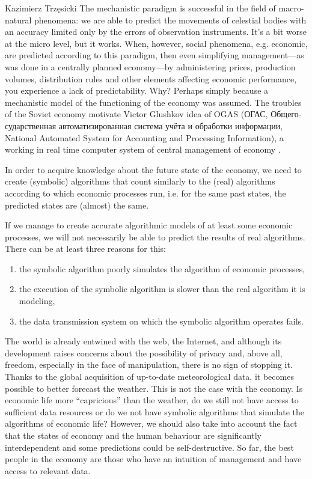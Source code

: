 \begin{artengenv}{Kazimierz Trzęsicki}
The mechanistic paradigm is successful in the field of macro-natural phenomena: we are able to predict the movements of celestial bodies with an accuracy limited only by the errors of observation instruments. It's a bit worse at the micro level, but it works. When, however, social phenomena, e.g. economic, are predicted according to this paradigm, then even simplifying management---as was done in a centrally planned economy---by administering prices, production volumes, distribution rules and other elements affecting economic performance, you experience a lack of predictability. Why? Perhaps simply because a mechanistic model of the functioning of the economy was assumed. The troubles of the Soviet economy motivate Victor Glushkov idea of  OGAS (\foreignlanguage{russian}{ОГАС}, \foreignlanguage{russian}{Общегосударственная автоматизированная система учёта и обработки информации}, National Automated System for Accounting and Processing Information), a working in real time computer system  of central management of  economy
\parencite{glushkov_chto_2004}.

In order to acquire knowledge about the future state of the economy, we need to create (symbolic) algorithms that count similarly to the (real) algorithms according to which economic processes run, i.e. for the same past states, the predicted states are (almost) the same.

If we manage to create accurate algorithmic models of at least some economic processes, we will not necessarily be able to predict the results of real algorithms. There can be at least three reasons for this: \begin{enumerate}
\item the symbolic algorithm poorly simulates the algorithm of economic processes,
\item the execution of the symbolic algorithm is slower than the real algorithm it is modeling,
\item the data transmission system on which the symbolic algorithm operates fails.
\end{enumerate}

The world is already entwined with the web, the Internet, and although its development raises concerns about the possibility of privacy and, above all, freedom, especially in the face of manipulation, there is no sign of stopping it. Thanks to the global acquisition of up-to-date meteorological data, it becomes possible to better forecast the weather. This is not the case with the economy. Is economic life more ``capricious'' than the weather, do we still not have access to sufficient data resources or do we not have symbolic algorithms that simulate the algorithms of economic life? However, we should also take into account the fact that the states of economy  and the human behaviour are significantly interdependent and some predictions could be self-destructive. So far, the best people in the economy are those who have an intuition of management and have access to relevant data.




\end{artengenv}
